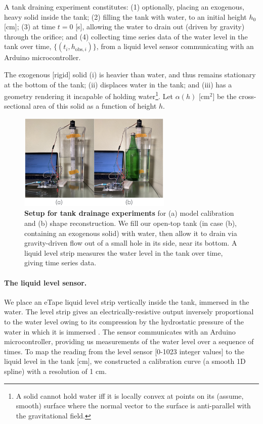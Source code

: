 \documentclass[openacc]{rsproca_new}%
\begin{document}
A tank draining experiment constitutes: 
(1) optionally, placing an exogenous, heavy solid inside the tank; 
(2) filling the tank with water, to an initial height $h_0$ [cm]; 
(3) at time $t=0$ [s], allowing the water to drain out (driven by gravity) through the orifice; and 
(4) collecting time series data of the water level in the tank over time, $\{(t_i, h_{\text{obs}, i}) \}$, from a liquid level sensor communicating with an Arduino microcontroller. 

The exogenous [rigid] solid (i) is heavier than water, and thus remains stationary at the bottom of the tank; (ii) displaces water in the tank; and (iii) has a geometry rendering it incapable of holding water\footnote{A solid cannot hold water iff it is locally convex at points on its (assume, smooth) surface where the normal vector to the surface is anti-parallel with the gravitational field.}. 
Let $\alpha(h)$ [cm$^2$] be the cross-sectional area of this solid as a function of height $h$.

\begin{figure}[h!]
\begin{center}
	\includegraphics[width=0.65\textwidth]{real_expt.png}
	\caption{\textbf{Setup for tank drainage experiments} for (a) model calibration and (b) shape reconstruction.
	We fill our open-top tank (in case (b), containing an exogenous solid) with water, then allow it to drain via gravity-driven flow out of a small hole in its side, near its bottom. A liquid level strip measures the water level in the tank over time, giving time series data.
	}
	\label{fig:photo_of_tank}
\end{center}
\end{figure}

\paragraph{The liquid level sensor.}
We place an eTape\texttrademark\xspace liquid level strip vertically inside the tank, immersed in the water. 
The level strip gives an electrically-resistive output inversely proportional to the water level owing to its compression by the hydrostatic pressure of the water in which it is immersed \cite{eTape}.
The sensor communicates with an Arduino microcontroller, providing us measurements of the water level over a sequence of times. 
To map the reading from the level sensor [0-1023 integer values] to the liquid level in the tank [cm], we constructed a calibration curve (a smooth 1D spline) with a resolution of 1 cm.
\end{document}

